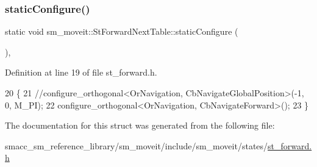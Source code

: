 \subsubsection{\texorpdfstring{static\+Configure()}{staticConfigure()}}
{\footnotesize\ttfamily static void sm\+\_\+moveit\+::\+St\+Forward\+Next\+Table\+::static\+Configure (\begin{DoxyParamCaption}{ }\end{DoxyParamCaption})\hspace{0.3cm}{\ttfamily [inline]}, {\ttfamily [static]}}



Definition at line 19 of file st\+\_\+forward.\+h.


\begin{DoxyCode}
20     \{
21         \textcolor{comment}{//configure\_orthogonal<OrNavigation, CbNavigateGlobalPosition>(-1, 0, M\_PI);}
22         configure\_orthogonal<OrNavigation, CbNavigateForward>();
23     \}
\end{DoxyCode}


The documentation for this struct was generated from the following file\+:\begin{DoxyCompactItemize}
\item 
smacc\+\_\+sm\+\_\+reference\+\_\+library/sm\+\_\+moveit/include/sm\+\_\+moveit/states/\hyperlink{st__forward_8h}{st\+\_\+forward.\+h}\end{DoxyCompactItemize}
